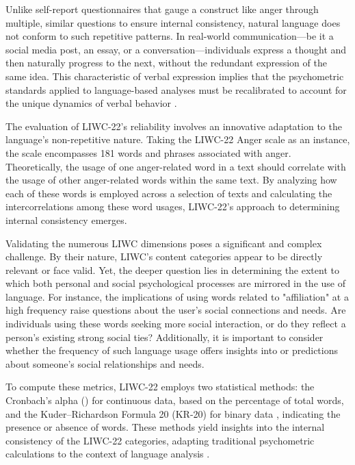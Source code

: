 Unlike self-report questionnaires that gauge a construct like anger through multiple, similar questions to ensure internal consistency, natural language does not conform to such repetitive patterns. In real-world communication—be it a social media post, an essay, or a conversation—individuals express a thought and then naturally progress to the next, without the redundant expression of the same idea. This characteristic of verbal expression implies that the psychometric standards applied to language-based analyses must be recalibrated to account for the unique dynamics of verbal behavior \cite{boyd2022development}.

The evaluation of LIWC-22's reliability involves an innovative adaptation to the language's non-repetitive nature. Taking the LIWC-22 Anger scale as an instance, the scale encompasses 181 words and phrases associated with anger. Theoretically, the usage of one anger-related word in a text should correlate with the usage of other anger-related words within the same text. By analyzing how each of these words is employed across a selection of texts and calculating the intercorrelations among these word usages, LIWC-22's approach to determining internal consistency emerges\cite{boyd2022development}.

Validating the numerous LIWC dimensions poses a significant and complex challenge. By their nature, LIWC's content categories appear to be directly relevant or face valid. Yet, the deeper question lies in determining the extent to which both personal and social psychological processes are mirrored in the use of language. For instance, the implications of using words related to "affiliation" at a high frequency raise questions about the user's social connections and needs. Are individuals using these words seeking more social interaction, or do they reflect a person's existing strong social ties? Additionally, it is important to consider whether the frequency of such language usage offers insights into or predictions about someone's social relationships and needs.

To compute these metrics, LIWC-22 employs two statistical methods: the Cronbach’s alpha (\textalpha) for continuous data, based on the percentage of total words, and the Kuder–Richardson Formula 20 (KR-20) for binary data \cite{kuder1937theory}, indicating the presence or absence of words. These methods yield insights into the internal consistency of the LIWC-22 categories, adapting traditional psychometric calculations to the context of language analysis \cite{boyd2022development}.

